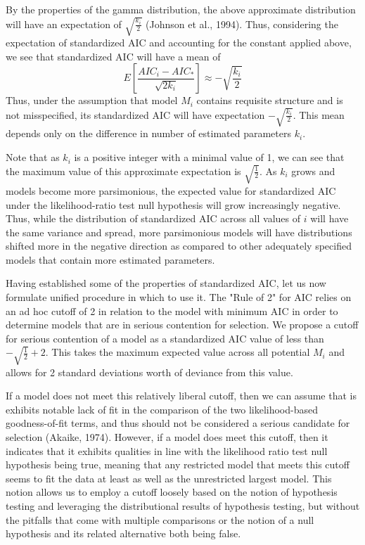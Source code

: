 		By the properties of the gamma distribution, the above approximate distribution will have an expectation of $\sqrt{\frac{k_i}{2}}$ (Johnson et al., 1994). Thus, considering the expectation
		of standardized AIC and accounting for the constant applied above, we see that standardized AIC will have a mean of
		\begin{equation}
			E \left[ \frac{AIC_i - AIC_*}{\sqrt{2k_i}} \right] \approx -\sqrt{\frac{k_i}{2}}
		\end{equation}
		Thus, under the assumption that model $M_i$ contains requisite structure and is not misspecified, its standardized AIC will have expectation $-\sqrt{\frac{k_i}{2}}$. This mean depends only
		on the difference in number of estimated parameters $k_i$.

		Note that as $k_i$ is a positive integer with a minimal value of 1, we can see that the maximum value of this approximate expectation is $\sqrt{\frac{1}{2}}$. As $k_i$ grows and models
		become more parsimonious, the expected value for standardized AIC under the likelihood-ratio test null hypothesis will grow increasingly negative. Thus, while the distribution of
		standardized AIC across all values of $i$ will have the same variance and spread, more parsimonious models will have distributions shifted more in the negative direction as
		compared to other adequately specified models that contain more estimated parameters.

		Having established some of the properties of standardized AIC, let us now formulate unified procedure in which to use it. The "Rule of 2" for AIC relies on an ad hoc cutoff of 2 in 
		relation to the model with minimum AIC in order to determine models that are in serious contention for selection. We propose a cutoff for serious contention of a model as a
		standardized AIC value of less than $-\sqrt{\frac{1}{2}} + 2$. This takes the maximum expected value across all potential $M_i$ and allows for 2 standard deviations worth of
		deviance from this value.
		
		If a model does not meet this relatively liberal cutoff, then we can assume that is exhibits notable lack of fit in the comparison of the two likelihood-based goodness-of-fit terms,
		and thus should not be considered a serious candidate for selection (Akaike, 1974). However, if a model does meet this cutoff, then it indicates that it exhibits qualities in line with the
		likelihood ratio test null hypothesis being true, meaning that any restricted model that meets this cutoff seems to fit the data at least as well as the unrestricted largest model.
		This notion allows us to employ a cutoff loosely based on the notion of hypothesis testing and leveraging the distributional results of hypothesis testing, but without the pitfalls
		that come with multiple comparisons or the notion of a null hypothesis and its related alternative both being false.

